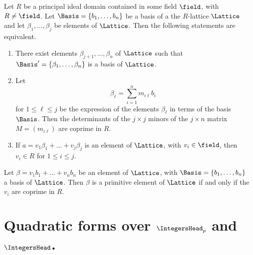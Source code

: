 \begin{theoremx}\label{thm:quadratic-form-lattice-equiv-conditions} Let \(R\) be
    a principal ideal domain contained in some field \(\field\), with \(R \neq
    \field\). Let \(\Basis = \{b_1, \dots, b_n\}\) be a basis of a the
    \(R\)-lattice \(\Lattice\) and let \(\beta_1, \dots, \beta_j\) be elements
    of \(\Lattice\). Then the following statements are equivalent.

    \medskip

    \begin{enumerate}[nosep, label=(\alph*)]
        \item There exist elements \(\beta_{j+1}, \dots, \beta_n\) of
        \(\Lattice\) such that \(\Basis' = \{\beta_1, \dots, \beta_n\}\) is a
        basis of \(\Lattice\).
        \item Let \[\beta_{\ell} = \sum_{i=1}^n m_{i\ell} b_i\] for \(1 \leq
        \ell \leq j\) be the expression of the elements \(\beta_{\ell}\) in
        terms of the basis \(\Basis\). Then the determinants of the \(j \times
        j\) minors of the \(j \times n\) matrix \(M = (m_{i\ell})\) are coprime
        in \(R\).
        \item If \(a = v_1\beta_1 + \dots + v_j\beta_j\) is an element of
        \(\Lattice\), with \(v_i \in \field\), then \(v_i \in R\) for \(1 \leq i
        \leq j\).
    \end{enumerate}
\end{theoremx}

\begin{corollary}
    Let \(\beta = v_1b_1 + \dots + v_nb_n\) be an element of \(\Lattice\), with
    \(\Basis = \{b_1, \dots, b_n\}\) a basis of \(\Lattice\). Then \(\beta\) is
    a primitive element of \(\Lattice\) if and only if the \(v_i\) are coprime
    in \(R\).
\end{corollary}

\section{Quadratic forms over \(\IntegersHead_p\) and \(\IntegersHead\).}
